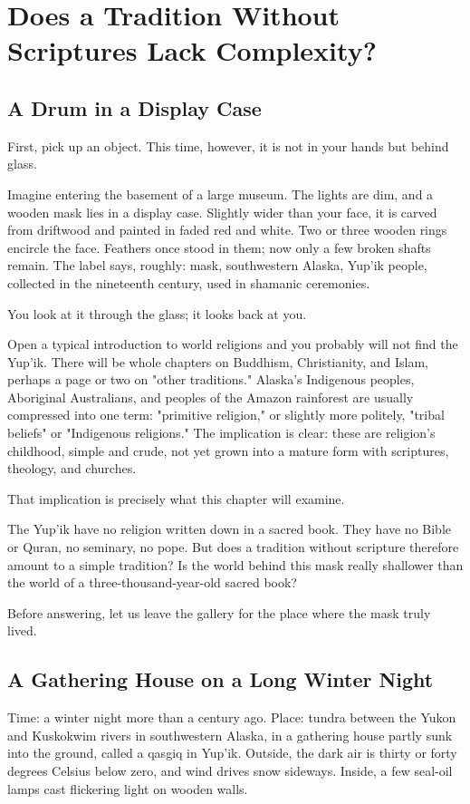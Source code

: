 \chapter[Complexity Without Scriptures]{Does a Tradition Without Scriptures Lack Complexity?}
\section{A Drum in a Display Case}
First, pick up an object. This time, however, it is not in your hands but behind glass.

Imagine entering the basement of a large museum. The lights are dim, and a wooden mask lies in a display case. Slightly wider than your face, it is carved from driftwood and painted in faded red and white. Two or three wooden rings encircle the face. Feathers once stood in them; now only a few broken shafts remain. The label says, roughly: mask, southwestern Alaska, Yup'ik people, collected in the nineteenth century, used in shamanic ceremonies.

You look at it through the glass; it looks back at you.

Open a typical introduction to world religions and you probably will not find the Yup'ik. There will be whole chapters on Buddhism, Christianity, and Islam, perhaps a page or two on "other traditions." Alaska's Indigenous peoples, Aboriginal Australians, and peoples of the Amazon rainforest are usually compressed into one term: "primitive religion," or slightly more politely, "tribal beliefs" or "Indigenous religions." The implication is clear: these are religion's childhood, simple and crude, not yet grown into a mature form with scriptures, theology, and churches.

That implication is precisely what this chapter will examine.

The Yup'ik have no religion written down in a sacred book. They have no Bible or Quran, no seminary, no pope. But does a tradition without scripture therefore amount to a simple tradition? Is the world behind this mask really shallower than the world of a three-thousand-year-old sacred book?

Before answering, let us leave the gallery for the place where the mask truly lived.

\section{A Gathering House on a Long Winter Night}
Time: a winter night more than a century ago. Place: tundra between the Yukon and Kuskokwim rivers in southwestern Alaska, in a gathering house partly sunk into the ground, called a qasgiq in Yup'ik. Outside, the dark air is thirty or forty degrees Celsius below zero, and wind drives snow sideways. Inside, a few seal-oil lamps cast flickering light on wooden walls.

